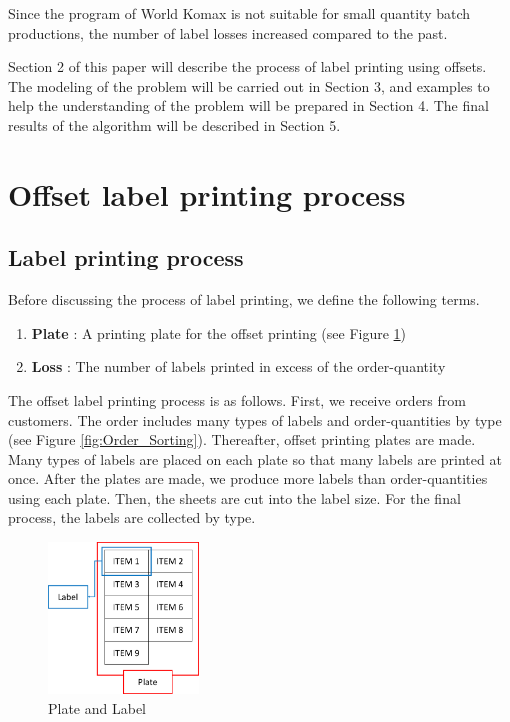 \documentclass[a4paper]{amsart}
\numberwithin{equation}{section} %
\numberwithin{figure}{section} %
\numberwithin{table}{section}
\theoremstyle{plain}
\theoremstyle{definition}
\theoremstyle{plain}
\theoremstyle{plain}
\theoremstyle{plain}
\theoremstyle{plain}
\theoremstyle{plain}
\begin{document}
\noindent
Since the program of World Komax is not suitable for small quantity batch productions, the number of label losses increased compared to the past.

Section 2 of this paper will describe the process of label printing using offsets. The modeling of the problem will be carried out in Section 3, and examples to help the understanding of the problem will be prepared in Section 4. The final results of the algorithm will be described in Section 5. 


\section{Offset label printing process}\label{sec:Offset}

\subsection{Label printing process}\label{subsec:LabelPrinting}
Before discussing the process of label printing, we define the following terms.
\begin{enumerate}[*]
	\item {\bf Plate} : A printing plate for the offset printing (see Figure \ref{fig:PlateLabel})
	\item {\bf Loss} : The number of labels printed in excess of the order-quantity
\end{enumerate}

The offset label printing process is as follows. First, we receive orders from customers. 
The order includes many types of labels and order-quantities by type (see Figure \ref{fig:Order_Sorting}). 
Thereafter, offset printing plates are made. 
Many types of labels are placed on each plate so that many labels are printed at once. 
After the plates are made, we produce more labels than order-quantities using each plate. 
Then, the sheets are cut into the label size. 
For the final process, the labels are collected by type.

\begin{figure}
	\includegraphics[width=4cm]{PlateLabel.pdf}
	\caption{Plate and Label}
	\label{fig:PlateLabel}       %
\end{figure}
\end{document}
